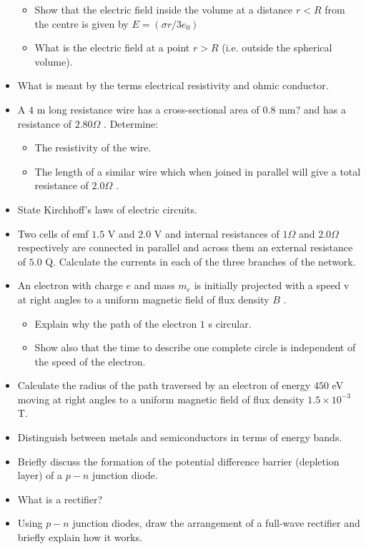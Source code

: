 \documentclass{article}
\begin{document}
\begin{itemize}
 \begin{itemize}
\item Show that the electric field inside the volume at a distance $ r<R$ from the centre is given by $ E=(\sigma r/3e_{0})$
\item What is the electric field at a point $ r>R$ (i.e. outside the spherical volume).
\end{itemize}
\item What is meant by the terms electrical resistivity and ohmic conductor.
\item A $ 4$ m long resistance wire has a cross-sectional area of $ 0.8$ mm? and has a resistance of $ 2.80\Omega $ .  Determine:
 \begin{itemize}
\item The resistivity of the wire.
\item The length of a similar wire which when joined in parallel will give a total resistance of $ 2.0\Omega $ .
\end{itemize}
\item State Kirchhoff’s laws of electric circuits.
\item Two cells of emf $ 1.5$ V and $ 2.0$ V and internal resistances of $ 1\Omega $ and $ 2.0\Omega $ respectively are connected in parallel and across them an external resistance of $ 5.0$ Q. Calculate the currents in each of the three branches of the network. 
\item An electron with charge $ e$ and mass $ m_{e}$ is initially projected with a speed v at right angles to a uniform magnetic field of flux density $ B$ .
 \begin{itemize}
\item Explain why the path of the electron $ 1$ s circular.
\item Show also that the time to describe one complete circle is independent of the speed of the electron.
\end{itemize}
\item Calculate the radius of the path traversed by an electron of energy $ 450$ eV moving at right angles to a uniform magnetic field of flux density $ 1.5\times 10^{-3}$ T.
\item Distinguish between metals and semiconductors in terms of energy bands. 
\item Briefly discuss the formation of the potential difference barrier (depletion layer) of a $ p-n$ junction diode.
\item What is a rectifier?
\item Using $ p-n$ junction diodes, draw the arrangement of a full-wave rectifier and briefly explain how it works.

\end{itemize}
\end{document}
